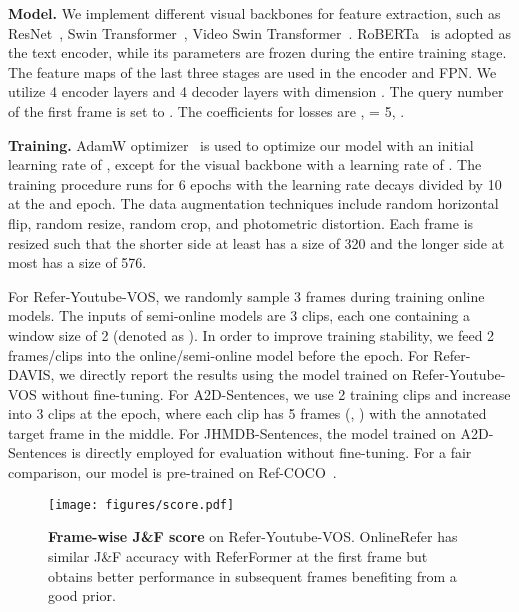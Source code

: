 \documentclass[10pt,twocolumn,letterpaper]{article}
\begin{document}
\noindent\textbf{Model.}
We implement different visual backbones for feature extraction, such as ResNet~\cite{resnet}, Swin Transformer~\cite{liu2021swin}, Video Swin Transformer~\cite{videoswin}.
RoBERTa~\cite{liu2019roberta} is adopted as the text encoder, while  its parameters are frozen during the entire training stage.
The feature maps of the last three stages are used in the encoder and FPN.
We utilize 4 encoder layers and 4 decoder layers with dimension .
The query number of the first frame is set to .
The coefficients for losses are ,  = 5, .








\noindent\textbf{Training.}
AdamW optimizer~\cite{loshchilov2017decoupled} is used to optimize our model with an initial learning rate of , except for the visual backbone with a learning rate of .
The training procedure runs for 6 epochs with the learning rate decays divided by 10 at the  and  epoch.
The data augmentation techniques  include random horizontal flip, random resize, random crop, and photometric distortion.
 Each frame is resized such that the shorter side at least has a size of 320 and the longer side at most has a size of 576.



 
For Refer-Youtube-VOS, we randomly sample 3 frames during training online models.
 The inputs of semi-online models are 3 clips, each one containing a window size of 2 (denoted as ).
In order to improve training stability, we feed 2 frames/clips into the online/semi-online model before the  epoch.
For Refer-DAVIS, we directly report the results using the model trained on Refer-Youtube-VOS without fine-tuning.
For A2D-Sentences, we use 2 training clips and increase into 3 clips at the  epoch, where each clip has 5 frames (\ie, ) with the annotated target frame in the middle.
For JHMDB-Sentences, the model trained on A2D-Sentences is directly employed for evaluation without fine-tuning.
For a fair comparison, our model is pre-trained on Ref-COCO~\cite{yu2016modeling}.

\begin{figure}
\centering
\small
	\texttt{[image: figures/score.pdf]}
	\vspace{-12pt}
	\caption{\textbf{Frame-wise J\&F score} on Refer-Youtube-VOS. OnlineRefer has similar J\&F accuracy with ReferFormer at the first frame but obtains better performance in subsequent frames benefiting from a good prior. }
	\vspace{-6 mm}
	\label{fig:score}
\end{figure}
\end{document}
